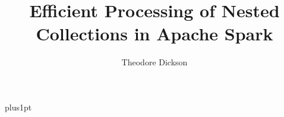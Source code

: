 \documentclass[12pt]{ociamthesis}  %
\title{Efficient Processing of Nested Collections in Apache Spark}   %
\author{Theodore Dickson}         %
\begin{document}
\baselineskip=18pt plus1pt

\setcounter{secnumdepth}{3}
\setcounter{tocdepth}{3}


\maketitle                  %

\begin{romanpages}          %
\tableofcontents            %
\end{romanpages}            %




%

%
%

\end{document}

